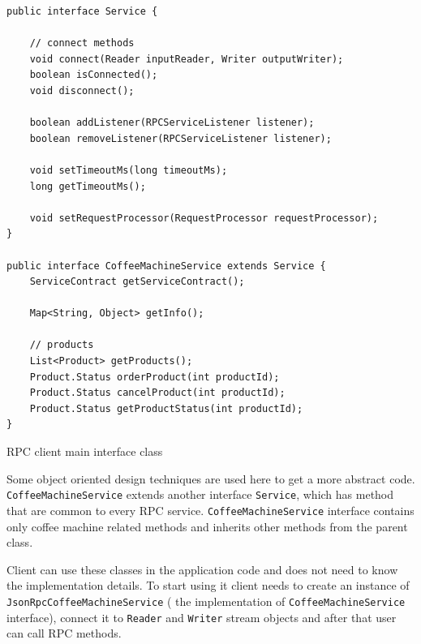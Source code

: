 \begin{listing}[H]
\begin{verbatim}
public interface Service {

    // connect methods
    void connect(Reader inputReader, Writer outputWriter);
    boolean isConnected();
    void disconnect();

    boolean addListener(RPCServiceListener listener);
    boolean removeListener(RPCServiceListener listener);

    void setTimeoutMs(long timeoutMs);
    long getTimeoutMs();

    void setRequestProcessor(RequestProcessor requestProcessor);
}               
               
public interface CoffeeMachineService extends Service {
    ServiceContract getServiceContract();
    
    Map<String, Object> getInfo();
    
    // products
    List<Product> getProducts();
    Product.Status orderProduct(int productId);
    Product.Status cancelProduct(int productId);
    Product.Status getProductStatus(int productId);
}
\end{verbatim}
\caption{RPC client main interface class}
\label{lst:rpc_client_interface_class}
\end{listing}

Some object oriented design techniques are used here to get a more abstract code. 
\texttt{CoffeeMachineService}  extends another
interface \texttt{Service}, which has method that are common to every RPC
service.
\texttt{CoffeeMachineService} interface contains only coffee machine related methods and
inherits other methods from the parent class.

Client can use these classes in the application code and does not need to know
the implementation details. To start using it client needs to create an instance
of \texttt{JsonRpcCoffeeMachineService} ( the implementation of
\texttt{CoffeeMachineService} interface), connect it to \texttt{Reader} and \texttt{Writer} stream objects and after that  user can call RPC methods.

